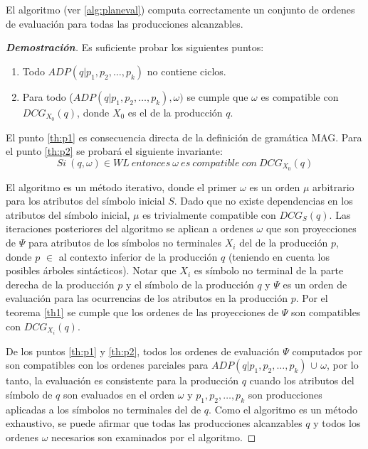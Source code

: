 \begin{theorem}
\label{th2}
El algoritmo  (ver \ref{alg:planeval}) computa correctamente un conjunto de ordenes de evaluación para todas las producciones alcanzables.
\end{theorem}

\begin{proof}[\textbf{Demostración}]
Es suficiente probar los siguientes puntos:
\begin{enumerate}
    \item \label{th:p1}Todo $ADP (q | p_{1}, p_{2}, \dots, p_{k})$ no contiene ciclos.

    \item \label{th:p2}Para todo ($ADP (q | p_{1}, p_{2}, \dots, p_{k}), \omega)$ se cumple que $\omega$ es compatible con $DCG_{X_{0}}(q)$,  donde $X_{0}$ es el  de la producción $q$.
\end{enumerate}

El punto \ref{th:p1} es consecuencia directa de la definición de gramática MAG. Para el punto \ref{th:p2} se probará el siguiente invariante:
$$
Si\ (q,\omega)\in WL\ entonces\ \omega\ es\ compatible\ con\ DCG_{X_{0}}(q)
$$

El algoritmo  es un método iterativo, donde el primer $\omega$ es un orden $\mu$ arbitrario para los atributos del símbolo inicial $S$. Dado que no existe dependencias en los atributos del símbolo inicial, $\mu$ es trivialmente compatible con $DCG_{S}(q)$. Las iteraciones posteriores del algoritmo  se aplican a ordenes $\omega$ que son proyecciones de $\Psi$ para atributos de los símbolos no terminales $X_{i}$ del  de la producción $p$, donde $p$ $\in$ al contexto inferior de la producción $q$ (teniendo en cuenta los posibles árboles sintácticos). Notar que $X_{i}$ es símbolo no terminal de la parte derecha de la producción $p$ y el símbolo  de la producción $q$ y $\Psi$ es un orden de evaluación para las ocurrencias de los atributos en la producción $p$. Por el teorema \ref{th1} se cumple que los ordenes de las proyecciones de $\Psi$ son compatibles con $DCG_{X_{i}}(q)$.

De los puntos \ref{th:p1} y \ref{th:p2}, todos los ordenes de evaluación $\Psi$ computados por  son compatibles con los ordenes parciales para $ADP (q | p_{1}, p_{2}, \dots, p_{k})$ $\cup$ $\omega$, por lo tanto, la evaluación es consistente para la producción $q$ cuando los atributos del símbolo  de $q$ son evaluados en el orden $\omega$ y $p_{1}, p_{2}, \dots, p_{k}$ son producciones aplicadas a los símbolos no terminales del  de $q$. Como el algoritmo es un método exhaustivo, se puede afirmar que todas las producciones alcanzables $q$ y todos los ordenes $\omega$ necesarios son examinados por el algoritmo.

\end{proof}

